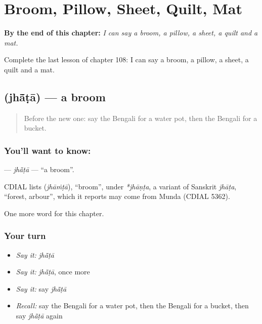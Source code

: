 
\chapter{Broom, Pillow, Sheet, Quilt, Mat}
\label{ch:bn-broom-pillow-sheet-quilt-mat}

\begin{chapteropening}
\textbf{By the end of this chapter:} \emph{I can say a broom, a pillow, a sheet, a quilt and a mat.}

Complete the last lesson of chapter 108: I can say a broom, a pillow, a sheet, a quilt and a mat.
\end{chapteropening}

\section[\texorpdfstring{\bn{ঝাঁটা} (jhā̃ṭā)}{ঝাঁটা (jhā̃ṭā)}]{ (jhā̃ṭā) — a broom}

\label{lesson:BN-C108-jhata}



\begin{quote}
Before the new one: say the Bengali for a water pot, then the Bengali for a bucket.
\end{quote}

\subsection*{You'll want to know: }
\textbf{} — \emph{jhā̃ṭā} — \textquotedblleft{}a broom\textquotedblright{}.

\begin{cousinweb}
CDIAL lists \textbf{} (\emph{jhāṁṭā}), \textquotedblleft{}broom\textquotedblright{}, under \emph{*jhāṇṭa}, a variant of Sanskrit \emph{jhāṭa}, \textquotedblleft{}forest, arbour\textquotedblright{}, which it reports may come from Munda (CDIAL 5362).
\end{cousinweb}

\begin{grammarlens}[title={What you've built}]
One more word for this chapter.
\end{grammarlens}

\subsection*{Your turn}
\begin{itemize}
\raggedright
  \item \emph{Say it:} \emph{jhā̃ṭā}
  \item \emph{Say it:} \emph{jhā̃ṭā}, once more
  \item \emph{Say it:} say \emph{jhā̃ṭā}
  \item \emph{Recall:} say the Bengali for a water pot, then the Bengali for a bucket, then say \emph{jhā̃ṭā} again
\end{itemize}

